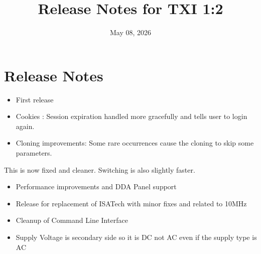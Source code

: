 \documentclass[letterpaper,10pt,english]{sphinxhowto}
\title{Release Notes for TXI 1:2}
\date{May 08, 2026}
\author{}
\begin{document}
\pagestyle{empty}

\pagestyle{plain}

\pagestyle{normal}
\label{\detokenize{index::doc}}


\sphinxstepscope


\section{Release Notes}
\label{\detokenize{topics/release_notes:release-notes}}\label{\detokenize{topics/release_notes::doc}}\begin{description}
\begin{itemize}
\item {} 
\sphinxAtStartPar
First release

\end{itemize}

\begin{itemize}
\item {} 
\sphinxAtStartPar
Cookies : Session expiration handled more gracefully and tells user to login again.

\item {} 
\sphinxAtStartPar
Cloning improvements: Some rare occurrences cause the cloning to skip some parameters.

\end{itemize}

\sphinxAtStartPar
This is now ﬁxed and cleaner. Switching is also slightly faster.

\begin{itemize}
\item {} 
\sphinxAtStartPar
Performance improvements and DDA Panel support

\end{itemize}

\begin{itemize}
\item {} 
\sphinxAtStartPar
Release for replacement of ISATech with minor ﬁxes and related to 10MHz

\end{itemize}

\begin{itemize}
\item {} 
\sphinxAtStartPar
Cleanup of Command Line Interface

\item {} 
\sphinxAtStartPar
Supply Voltage is secondary side so it is DC not AC even if the supply type is AC


\end{itemize}
\end{description}
\end{document}
